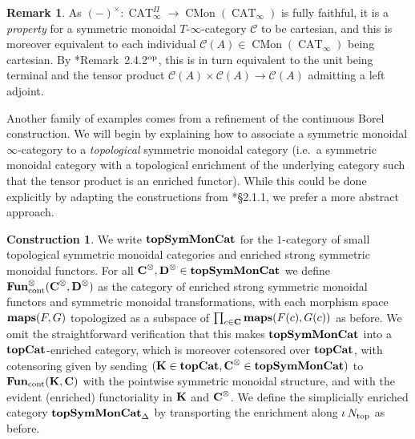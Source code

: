 \documentclass[reqno]{memo-l}
\theoremstyle{mythm}
\theoremstyle{definition}
\newtheorem{rk}[thm]{Remark}
\newtheorem{constr}[thm]{Construction}
\numberwithin{equation}{section}
\newcommand{\Cc}{{\mathcal{C}}}
\DeclareMathOperator{\CAT}{CAT}
\DeclareMathOperator{\CMon}{CMon}
\newcommand{\Ntop}{{N_\textup{top}}}
\newcommand{\cat}[1]{\textbf{\textup{#1}}}
\newcommand{\FUN}{\cat{Fun}}
\newcommand{\maps}{\cat{maps}}
\newcommand{\op}{{\textup{op}}}
\DeclareMathOperator{\core}{\iota}
\newcommand{\cont}{\textup{cont}}
\begin{document}
\begin{rk}\label{rk:what-it-means-to-be-cartesian}
    As $(-)^\times\colon\CAT^\Pi_\infty\to\CMon(\CAT_\infty)$ is fully faithful, it is a \emph{property} for a symmetric monoidal $T$-$\infty$-category $\Cc$ to be cartesian, and this is moreover equivalent to each individual $\Cc(A)\in\CMon(\CAT_\infty)$ being cartesian. By \cite{CHLL_Bispans}*{Remark~2.4.2${}^\op$}, this is in turn equivalent to the unit being terminal and the tensor product $\Cc(A)\times\Cc(A)\to\Cc(A)$ admitting a left adjoint.
\end{rk}

Another family of examples comes from a refinement of the continuous Borel construction. We will begin by explaining how to associate a symmetric monoidal $\infty$-category to a \emph{topological} symmetric monoidal category (i.e.\ a symmetric monoidal category with a topological enrichment of the underlying category such that the tensor product is an enriched functor). While this could be done explicitly by adapting the constructions from \cite{HA}*{§2.1.1}, we prefer a more abstract approach.

\begin{constr}
    We write $\cat{topSymMonCat}$ for the $1$-category of small topological symmetric monoidal categories and enriched strong symmetric monoidal functors. For all $\cat{C}^\otimes,\cat{D}^\otimes\in\cat{topSymMonCat}$ we define $\cat{Fun}_\cont^\otimes(\cat{C}^\otimes,\cat{D}^\otimes)$ as the category of enriched strong symmetric monoidal functors and symmetric monoidal transformations, with each morphism space $\maps(F,G)$ topologized as a subspace of $\prod_{c\in\cat{C}}\maps(F(c),G(c))$ as before. We omit the straightforward verification that this makes $\cat{topSymMonCat}$ into a $\cat{topCat}$-enriched category, which is moreover cotensored over $\cat{topCat}$, with cotensoring given by sending $(\cat{K}\in\cat{topCat},\cat{C}^\otimes\in\cat{topSymMonCat})$ to $\FUN_\cont(\cat{K},\cat{C})$ with the pointwise symmetric monoidal structure, and with the evident (enriched) functoriality in $\cat{K}$ and $\cat{C}^\otimes$. We define the simplicially enriched category $\cat{topSymMonCat}_\Delta$ by transporting the enrichment along $\core\Ntop$ as before.
\end{constr}
\end{document}
